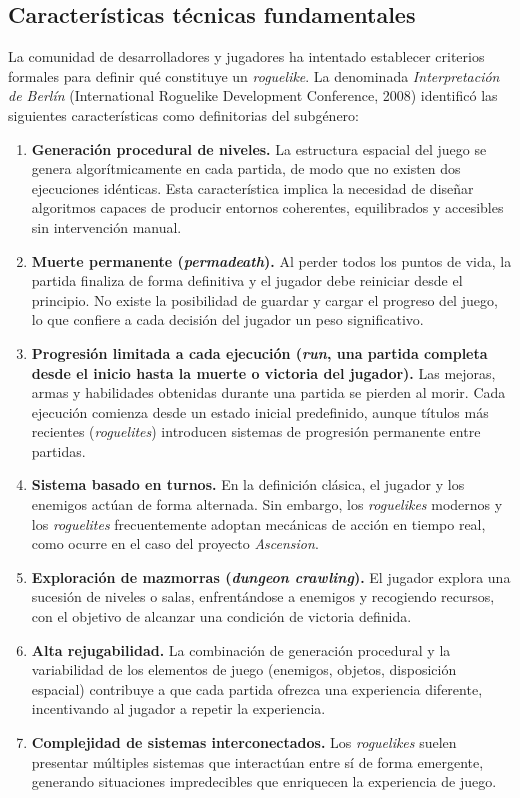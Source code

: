 \subsection{Características técnicas fundamentales}


La comunidad de desarrolladores y jugadores ha intentado establecer criterios formales para definir qué constituye un \textit{roguelike}. La denominada \textit{Interpretación de Berlín} (International Roguelike Development Conference, 2008) \cite{BERLIN_INTERPRETATION} identificó las siguientes características como definitorias del subgénero:

\begin{enumerate}
\item \textbf{Generación procedural de niveles.} La estructura espacial del juego se genera algorítmicamente en cada partida, de modo que no existen dos ejecuciones idénticas. Esta característica implica la necesidad de diseñar algoritmos capaces de producir entornos coherentes, equilibrados y accesibles sin intervención manual.
\item \textbf{Muerte permanente (\textit{permadeath}).} Al perder todos los puntos de vida, la partida finaliza de forma definitiva y el jugador debe reiniciar desde el principio. No existe la posibilidad de guardar y cargar el progreso del juego, lo que confiere a cada decisión del jugador un peso significativo.
\item \textbf{Progresión limitada a cada ejecución (\textit{run}, una partida completa desde el inicio hasta la muerte o victoria del jugador).} Las mejoras, armas y habilidades obtenidas durante una partida se pierden al morir. Cada ejecución comienza desde un estado inicial predefinido, aunque títulos más recientes (\textit{roguelites}) introducen sistemas de progresión permanente entre partidas.
\item \textbf{Sistema basado en turnos.} En la definición clásica, el jugador y los enemigos actúan de forma alternada. Sin embargo, los \textit{roguelikes} modernos y los \textit{roguelites} frecuentemente adoptan mecánicas de acción en tiempo real, como ocurre en el caso del proyecto \textit{Ascension}.
\item \textbf{Exploración de mazmorras (\textit{dungeon crawling}).} El jugador explora una sucesión de niveles o salas, enfrentándose a enemigos y recogiendo recursos, con el objetivo de alcanzar una condición de victoria definida.
\item \textbf{Alta rejugabilidad.} La combinación de generación procedural y la variabilidad de los elementos de juego (enemigos, objetos, disposición espacial) contribuye a que cada partida ofrezca una experiencia diferente, incentivando al jugador a repetir la experiencia.
\item \textbf{Complejidad de sistemas interconectados.} Los \textit{roguelikes} suelen presentar múltiples sistemas que interactúan entre sí de forma emergente, generando situaciones impredecibles que enriquecen la experiencia de juego.
\end{enumerate}

